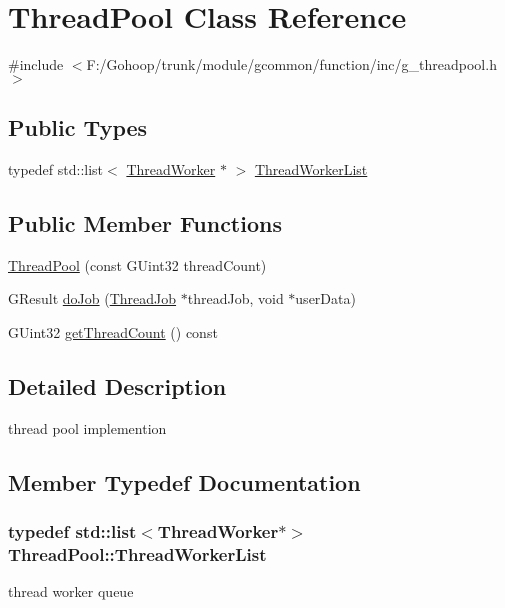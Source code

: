 \hypertarget{class_thread_pool}{\section{Thread\-Pool Class Reference}
\label{class_thread_pool}
}


{\ttfamily \#include $<$F\-:/\-Gohoop/trunk/module/gcommon/function/inc/g\-\_\-threadpool.\-h$>$}

\subsection*{Public Types}
\begin{DoxyCompactItemize}
\item 
typedef std\-::list$<$ \hyperlink{class_thread_worker}{Thread\-Worker} $\ast$ $>$ \hyperlink{class_thread_pool_a8b34f96bdcec943797a3950d264bec5d}{Thread\-Worker\-List}
\end{DoxyCompactItemize}
\subsection*{Public Member Functions}
\begin{DoxyCompactItemize}
\item 
\hyperlink{class_thread_pool_ac8b77b23f0507fb9c8ebc368677c9c5f}{Thread\-Pool} (const G\-Uint32 thread\-Count)
\item 
G\-Result \hyperlink{class_thread_pool_a5d4848719841e5866347e09863fea56c}{do\-Job} (\hyperlink{class_thread_job}{Thread\-Job} $\ast$thread\-Job, void $\ast$user\-Data)
\item 
G\-Uint32 \hyperlink{class_thread_pool_a49e032cf5a019c6e7b82fdf842c0ad5b}{get\-Thread\-Count} () const 
\end{DoxyCompactItemize}


\subsection{Detailed Description}
thread pool implemention 

\subsection{Member Typedef Documentation}
\hypertarget{class_thread_pool_a8b34f96bdcec943797a3950d264bec5d}{
\subsubsection[{Thread\-Worker\-List}]{\setlength{\rightskip}{0pt plus 5cm}typedef std\-::list$<${\bf Thread\-Worker}$\ast$$>$ {\bf Thread\-Pool\-::\-Thread\-Worker\-List}}}\label{class_thread_pool_a8b34f96bdcec943797a3950d264bec5d}
thread worker queue 

